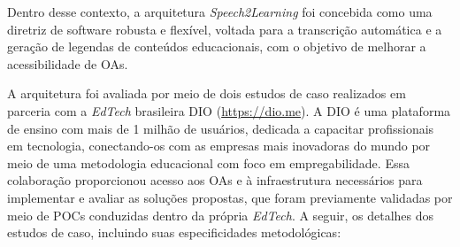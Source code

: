 Dentro desse contexto, a arquitetura \textit{Speech2Learning} foi concebida como uma diretriz de software robusta e flexível, voltada para a transcrição automática e a geração de legendas de conteúdos educacionais, com o objetivo de melhorar a acessibilidade de OAs. 

A arquitetura foi avaliada por meio de dois estudos de caso realizados em parceria com a \textit{EdTech} brasileira DIO (\url{https://dio.me}). A DIO é uma plataforma de ensino com mais de 1 milhão de usuários, dedicada a capacitar profissionais em tecnologia, conectando-os com as empresas mais inovadoras do mundo por meio de uma metodologia educacional com foco em empregabilidade. Essa colaboração proporcionou acesso aos OAs e à infraestrutura necessários para implementar e avaliar as soluções propostas, que foram previamente validadas por meio de POCs conduzidas dentro da própria \textit{EdTech}. A seguir, os detalhes dos estudos de caso, incluindo suas especificidades metodológicas:

